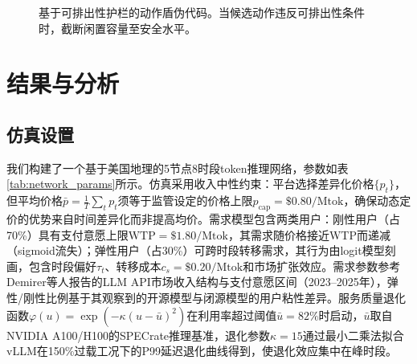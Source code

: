 \documentclass[11pt,a4paper,twocolumn]{article}
\begin{document}
\begin{figure}[htbp]
\centering
{}
\caption{基于可排出性护栏的动作盾伪代码。当候选动作违反可排出性条件时，截断闲置容量至安全水平。}
\label{alg:shield}
\end{figure}

\section{结果与分析}

\subsection{仿真设置}

我们构建了一个基于美国地理的5节点8时段token推理网络，参数如表\ref{tab:network_params}所示。仿真采用收入中性约束：平台选择差异化价格$\{p_t\}$，但平均价格$\bar{p} = \frac{1}{T}\sum_t p_t$须等于监管设定的价格上限$p_{\text{cap}} = \$0.80/\text{Mtok}$，确保动态定价的优势来自时间差异化而非提高均价。需求模型包含两类用户：刚性用户（占70\%）具有支付意愿上限$\text{WTP}=\$1.80/\text{Mtok}$，其需求随价格接近WTP而递减（sigmoid流失）；弹性用户（占30\%）可跨时段转移需求，其行为由logit模型刻画，包含时段偏好$\tau_t$、转移成本$c_s=\$0.20/\text{Mtok}$和市场扩张效应。需求参数参考Demirer等人\cite{demirer2025emerging}报告的LLM API市场收入结构与支付意愿区间（2023--2025年），弹性/刚性比例基于其观察到的开源模型与闭源模型的用户粘性差异。服务质量退化函数$\varphi(u) = \exp(-\kappa(u - \bar{u})^2)$在利用率超过阈值$\bar{u}=82\%$时启动，$\bar{u}$取自NVIDIA A100/H100的SPECrate推理基准，退化参数$\kappa=15$通过最小二乘法拟合vLLM在150\%过载工况下的P99延迟退化曲线得到，使退化效应集中在峰时段。
\end{document}
